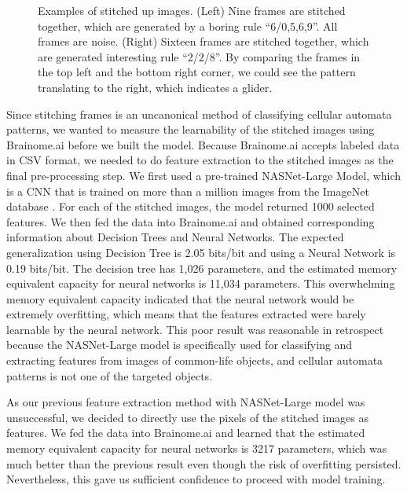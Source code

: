 \documentclass[12pt]{article}
\numberwithin{figure}{section} %
\begin{document}
\begin{figure}[H]
\begin{subfigure}{0.53\textwidth}
   	\end{subfigure}
   	\caption[Examples of stitched images]{Examples of stitched up images. (Left) Nine frames are stitched together, which are generated by a boring rule “6/0,5,6,9”. All frames are noise. (Right) Sixteen frames are stitched together, which are generated interesting rule “2/2/8”. By comparing the frames in the top left and the bottom right corner, we could see the pattern translating to the right, which indicates a glider.}
   	\vspace{-1.5em}
   	\label{fig:stitched image examples}
\end{figure}

Since stitching frames is an uncanonical method of classifying cellular automata patterns, we wanted to measure the learnability of the stitched images using Brainome.ai \cite{Brainome} before we built the model. Because Brainome.ai accepts labeled data in CSV format, we needed to do feature extraction to the stitched images as the final pre-processing step. We first used a pre-trained NASNet-Large Model, which is a CNN that is trained on more than a million images from the ImageNet database \cite{ImageNet}. For each of the stitched images, the model returned 1000 selected features. We then fed the data into Brainome.ai and obtained corresponding information about Decision Trees and Neural Networks. The expected generalization using Decision Tree is 2.05 bits/bit and using a Neural Network is 0.19 bits/bit.  The decision tree has 1,026 parameters, and the estimated memory equivalent capacity for neural networks is 11,034 parameters. This overwhelming memory equivalent capacity indicated that the neural network would be extremely overfitting, which means that the features extracted were barely learnable by the neural network. This poor result was reasonable in retrospect because the NASNet-Large model is specifically used for classifying and extracting features from images of common-life objects, and cellular automata patterns is not one of the targeted objects. 

As our previous feature extraction method with NASNet-Large model was unsuccessful, we decided to directly use the pixels of the stitched images as features. We fed the data into Brainome.ai and learned that the estimated memory equivalent capacity for neural networks is 3217 parameters, which was much better than the previous result even though the risk of overfitting persisted. Nevertheless, this gave us sufficient confidence to proceed with model training. 
\end{document}
